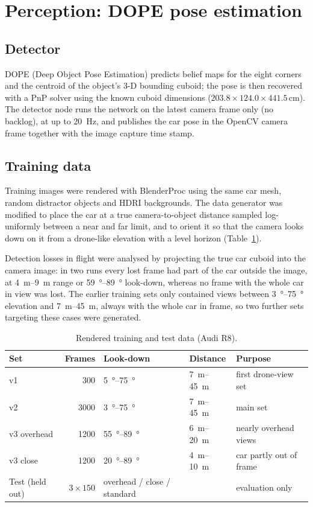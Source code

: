 \documentclass[11pt,a4paper]{report}
\begin{document}
\section{Perception: DOPE pose estimation}
\label{sec:perception}

\subsection{Detector}
DOPE (Deep Object Pose Estimation) predicts belief maps for the eight corners
and the centroid of the object's 3-D bounding cuboid; the pose is then recovered
with a PnP solver using the known cuboid dimensions
($203.8\times124.0\times441.5$\,cm). The detector node runs the network on the
latest camera frame only (no backlog), at up to \SI{20}{Hz}, and publishes the
car pose in the OpenCV camera frame together with the image capture time stamp.

\subsection{Training data}
Training images were rendered with BlenderProc using the same car mesh, random
distractor objects and HDRI backgrounds. The data generator was modified to
place the car at a true camera-to-object distance sampled log-uniformly between
a near and far limit, and to orient it so that the camera looks down on it from
a drone-like elevation with a level horizon (Table~\ref{tab:datasets}).

Detection losses in flight were analysed by projecting the true car cuboid into
the camera image: in two runs every lost frame had part of the car outside the
image, at \SIrange{4}{9}{m} range or \SIrange{59}{89}{\degree} look-down,
whereas no frame with the whole car in view was lost. The earlier training
sets only contained views between \SIrange{3}{75}{\degree} elevation and
\SIrange{7}{45}{m}, always with the whole car in frame, so two further sets
targeting these cases were generated.

\begin{table}[htbp]
  \centering
  \caption{Rendered training and test data (Audi R8).}
  \label{tab:datasets}
  \begin{tabular}{@{}lrlll@{}}
    \toprule
    Set & Frames & Look-down & Distance & Purpose \\
    \midrule
    v1 & 300 & \SIrange{5}{75}{\degree} & \SIrange{7}{45}{m} & first drone-view set \\
    v2 & 3000 & \SIrange{3}{75}{\degree} & \SIrange{7}{45}{m} & main set \\
    v3 overhead & 1200 & \SIrange{55}{89}{\degree} & \SIrange{6}{20}{m} & nearly overhead views \\
    v3 close & 1200 & \SIrange{20}{89}{\degree} & \SIrange{4}{10}{m} & car partly out of frame \\
    Test (held out) & $3\times150$ & overhead / close / standard & & evaluation only \\
    \bottomrule
  \end{tabular}
\end{table}
\end{document}
